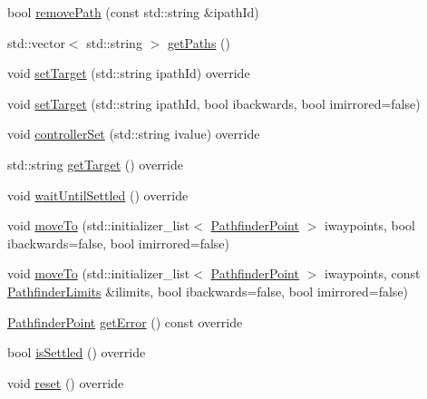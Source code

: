 \begin{DoxyCompactItemize}
\item 
bool \mbox{\hyperlink{classokapi_1_1AsyncMotionProfileController_a6c6a889067dbb3a54c33f829b3aa1246}{remove\+Path}} (const std\+::string \&ipath\+Id)
\item 
std\+::vector$<$ std\+::string $>$ \mbox{\hyperlink{classokapi_1_1AsyncMotionProfileController_a5853ae5af552cf56f36c9563733c6ace}{get\+Paths}} ()
\item 
void \mbox{\hyperlink{classokapi_1_1AsyncMotionProfileController_adf705d6bfd3d0a83d8a6c50a05ffd156}{set\+Target}} (std\+::string ipath\+Id) override
\item 
void \mbox{\hyperlink{classokapi_1_1AsyncMotionProfileController_a2846d2e36b86b39aa2e761e4e34cd225}{set\+Target}} (std\+::string ipath\+Id, bool ibackwards, bool imirrored=false)
\item 
void \mbox{\hyperlink{classokapi_1_1AsyncMotionProfileController_a292b22f53ed0ef67a479e00c92f68e3f}{controller\+Set}} (std\+::string ivalue) override
\item 
std\+::string \mbox{\hyperlink{classokapi_1_1AsyncMotionProfileController_a9f9e44e987481619cbec37d5e35c71e8}{get\+Target}} () override
\item 
void \mbox{\hyperlink{classokapi_1_1AsyncMotionProfileController_a0b08d2f39d786739a734c50523db1eb2}{wait\+Until\+Settled}} () override
\item 
void \mbox{\hyperlink{classokapi_1_1AsyncMotionProfileController_a027d632b17e5e9e0acbcb5b4000d038c}{move\+To}} (std\+::initializer\+\_\+list$<$ \mbox{\hyperlink{structokapi_1_1PathfinderPoint}{Pathfinder\+Point}} $>$ iwaypoints, bool ibackwards=false, bool imirrored=false)
\item 
void \mbox{\hyperlink{classokapi_1_1AsyncMotionProfileController_a5845299e779fc876f6226aa083ddfaa8}{move\+To}} (std\+::initializer\+\_\+list$<$ \mbox{\hyperlink{structokapi_1_1PathfinderPoint}{Pathfinder\+Point}} $>$ iwaypoints, const \mbox{\hyperlink{structokapi_1_1PathfinderLimits}{Pathfinder\+Limits}} \&ilimits, bool ibackwards=false, bool imirrored=false)
\item 
\mbox{\hyperlink{structokapi_1_1PathfinderPoint}{Pathfinder\+Point}} \mbox{\hyperlink{classokapi_1_1AsyncMotionProfileController_aae5c2ef0766fba9e635c43c0314da10a}{get\+Error}} () const override
\item 
bool \mbox{\hyperlink{classokapi_1_1AsyncMotionProfileController_abfc944ba6d703dc1aa6fb16a44b5e395}{is\+Settled}} () override
\item 
void \mbox{\hyperlink{classokapi_1_1AsyncMotionProfileController_a9ad15272defac4db5e2b318671eb3850}{reset}} () override

\end{DoxyCompactItemize}
